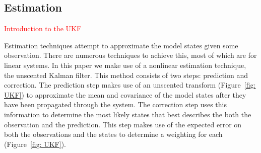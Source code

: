\documentclass{article}%
\newcommand\red{\textcolor{red}}
\begin{document}
\subsection{Estimation}

%


\red{Introduction to the UKF}

Estimation techniques attempt to approximate the model states given some observation. There are numerous techniques to achieve this, most of which are for linear systems. In this paper we make use of a nonlinear estimation technique, the unscented Kalman filter. This method consists of two steps: prediction and correction. The prediction step makes use of an unscented transform (Figure~\ref{fig: UKF}) to approximate the mean and covariance of the model states after they have been propagated through the system. The correction step uses this information to determine the most likely states that best describes the both the observation and the prediction. This step makes use of the expected error on both the observations and the states to determine a weighting for each (Figure~\ref{fig: UKF}).
\end{document}
